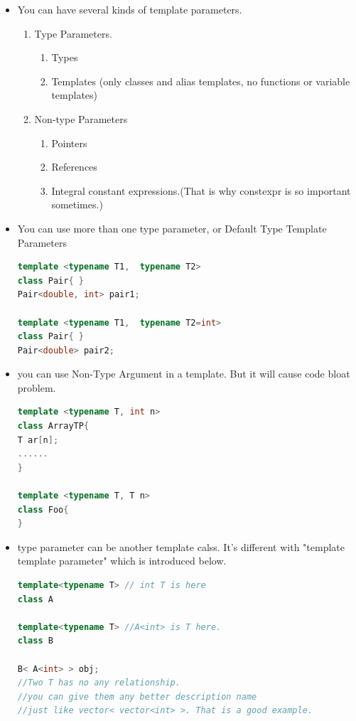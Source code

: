 \documentclass[a4paper,12pt,twoside]{book}
\begin{document}
\begin{itemize}
\item You can have several kinds of template parameters.
\begin{enumerate}
\item  Type Parameters.
  	\begin{enumerate}
   	\item Types
    \item  Templates (only classes and alias templates, no functions or variable templates)
	\end{enumerate}

\item Non-type Parameters
   \begin{enumerate}
	\item Pointers
	\item References
	\item Integral constant expressions.(That is why constexpr is so important sometimes.)
	\end{enumerate}
\end{enumerate}

\item You can use more than one type parameter, or Default Type Template Parameters
\begin{lstlisting}[frame=single, language=c++]
template <typename T1,  typename T2>
class Pair{ }
Pair<double, int> pair1;

template <typename T1,  typename T2=int>
class Pair{ }
Pair<double> pair2;
\end{lstlisting}

\item you can use Non-Type Argument in a template. But it will cause code bloat problem. 
\begin{lstlisting}[frame=single, language=c++]
template <typename T, int n>
class ArrayTP{
T ar[n];
......
}

template <typename T, T n>
class Foo{
}
\end{lstlisting}

\item type parameter can be another template calss.  It's different with "template template parameter" which is introduced below.
\begin{lstlisting}[frame=single, language=c++]
template<typename T> // int T is here
class A

template<typename T> //A<int> is T here.
class B

B< A<int> > obj;
//Two T has no any relationship.
//you can give them any better description name
//just like vector< vector<int> >. That is a good example.
\end{lstlisting}


\end{itemize}
\end{document}
